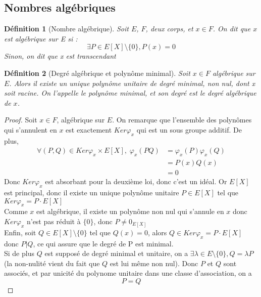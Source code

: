 \documentclass[a4paper,12pt,french]{report}
\newtheorem{definition}{Définition}[section]
\begin{document}
		\subsection{Nombres algébriques}
			\begin{definition}[Nombre algébrique]
				Soit \(E\), \(F\), deux corps,  et \(x \in F\). On dit que \(x\) est \emph{algébrique} sur E si : 
				\[
					\exists P \in E[X]\setminus\{0\} , P(x) = 0
				\]
				Sinon, on dit que x est \emph{transcendant}
			\end{definition}
			\begin{definition}[Degré algébrique et polynôme minimal]
				Soit \(x \in F \) algébrique sur \(E\). Alors il existe un unique polynôme unitaire de degré minimal, non nul, dont x soit racine. On l'appelle le \emph{polynôme minimal}, et son degré est le \emph{degré algébrique} de \(x\).{}
			\end{definition}
				\begin{proof}
					Soit \(x \in F\), algébrique sur \(E\). On remarque que l'ensemble des polynômes qui s'annulent en \(x\) est exactement \(Ker \varphi_{x}\) qui est un sous groupe additif. De plus, 
					\[
						\begin{aligned}
							\forall (P,Q) \in Ker\varphi_{x} \times E[X], \; \varphi_{x}(PQ) &= \varphi_{x}(P)\varphi_{x}(Q) \\
											&=P(x)Q(x) \\
											&= 0
						\end{aligned}
					\]
					Donc \(Ker \varphi_{x}\) est absorbant pour la deuxième loi, donc c'est un idéal. Or \(E[X]\) est principal, donc il existe un unique polynôme unitaire \(P \in E[X]\) tel que \(Ker \varphi_{x} = P \cdot E[X]\)\\
					Comme \(x\) est algébrique, il existe un polynôme non nul qui s'annule en \(x\) donc \(Ker \varphi_{x}\) n'est pas réduit à \(\{0\}\), donc \(P \neq 0_{E[X]}\) \\
					Enfin, soit \(Q \in E[X]\setminus\{0\}\) tel que \( Q(x) = 0 \), alors \(Q \in Ker \varphi_{x} = P \cdot E[X] \) donc \(P | Q\), ce qui assure que le degré de P est minimal.\\
					Si de plus \(Q\) est supposé de degré minimal et unitaire, on a \(\exists \lambda \in E\setminus\{0\} , Q = \lambda P \) (la non-nulité vient du fait que \(Q\) est lui même non nul). Donc \(P\) et \(Q\) sont associés, et par unicité du polynome unitaire dans une classe d'association, on a \[P = Q\] 
				\end{proof}
			
\end{document}
